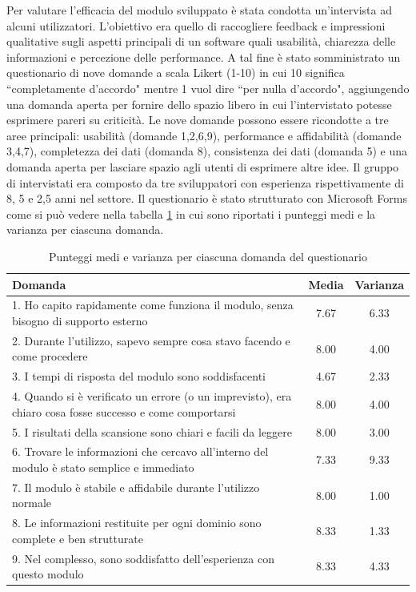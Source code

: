 \documentclass[target=bach,aauheader=,style=]{thud}
\begin{document}
Per valutare l'efficacia del modulo sviluppato è stata condotta un'intervista ad alcuni utilizzatori. L'obiettivo era quello di raccogliere feedback e impressioni qualitative sugli aspetti principali
di un software quali usabilità, chiarezza delle informazioni e percezione delle performance. A tal fine è stato somministrato un questionario di nove domande a scala Likert (1-10) in cui 10 significa
``completamente d'accordo" mentre 1 vuol dire ``per nulla d'accordo", aggiungendo una domanda aperta per fornire dello spazio libero in cui l'intervistato potesse esprimere pareri su criticità.
Le nove domande possono essere ricondotte a tre aree principali: usabilità (domande 1,2,6,9), performance e affidabilità (domande 3,4,7), completezza dei dati (domanda 8), consistenza dei dati
(domanda 5) e una domanda aperta per lasciare spazio agli utenti di esprimere altre idee. Il gruppo di intervistati era composto da tre sviluppatori con esperienza rispettivamente di 8, 5 e 2,5 anni nel settore.
Il questionario è stato strutturato con Microsoft Forms come si può vedere nella tabella \ref{tab:questionnaire_results} in cui sono riportati i punteggi medi e la varianza per ciascuna domanda.
\begin{table}[h]
\centering
\caption{Punteggi medi e varianza per ciascuna domanda del questionario}
    \label{tab:questionnaire_results}
    \begin{tabular}{|p{13cm}|c|c|}
    \hline
    \textbf{Domanda} & \textbf{Media} & \textbf{Varianza} \\
    \hline
    1. Ho capito rapidamente come funziona il modulo, senza bisogno di supporto esterno & 7.67 & 6.33 \\
    \hline
    2. Durante l'utilizzo, sapevo sempre cosa stavo facendo e come procedere & 8.00 & 4.00 \\
    \hline
    3. I tempi di risposta del modulo sono soddisfacenti & 4.67 & 2.33 \\
    \hline
    4. Quando si è verificato un errore (o un imprevisto), era chiaro cosa fosse successo e come comportarsi & 8.00 & 4.00 \\
    \hline
    5. I risultati della scansione sono chiari e facili da leggere & 8.00 & 3.00 \\
    \hline
    6. Trovare le informazioni che cercavo all'interno del modulo è stato semplice e immediato & 7.33 & 9.33 \\
    \hline
    7. Il modulo è stabile e affidabile durante l'utilizzo normale & 8.00 & 1.00 \\
    \hline
    8. Le informazioni restituite per ogni dominio sono complete e ben strutturate & 8.33 & 1.33 \\
    \hline
    9. Nel complesso, sono soddisfatto dell'esperienza con questo modulo & 8.33 & 4.33 \\
    \hline
    \end{tabular}
\end{table}
\end{document}
